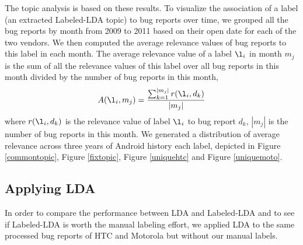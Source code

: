 \documentclass[10pt, conference, compsocconf]{IEEEtran}
\begin{document}
The topic analysis is based on these results. 
To visualize the association of a label (an extracted
Labeled-LDA topic) to bug reports over time,
we grouped
all the bug reports by month from 2009 to 2011 based on their open
date for each of the two vendors. 
We then computed the average relevance values of bug
reports to this label in each month. 
The average relevance value of a label \begin{math} \l_i \end{math} in
month \begin{math} m_j \end{math} is the sum of all the relevance
values of this label over all bug reports in this month divided by the
number of bug reports in this month,
\begin{equation}
A(\l_i,m_j) = \frac{\sum_{\substack{k=1}}^{|m_j|}r(\l_i,d_k)}{|m_j|}
\label{equation1}
\end{equation}
where $r(\l_i,d_k)$ is the relevance value of label $\l_i$ to bug
report $d_k$, $|m_j|$ is the number of bug reports in this month. 
We generated a distribution of average relevance across three years of
Android history
each label, depicted in Figure \ref{commontopic}, Figure \ref{fixtopic},
Figure \ref{uniquehtc} and Figure \ref{uniquemoto}.


\subsection{Applying LDA}




In order to compare the performance between LDA and Labeled-LDA and
 to see if Labeled-LDA is worth the manual labeling effort, 
we applied LDA to the same processed bug reports of HTC and Motorola
but without our manual labels. 
\end{document}
